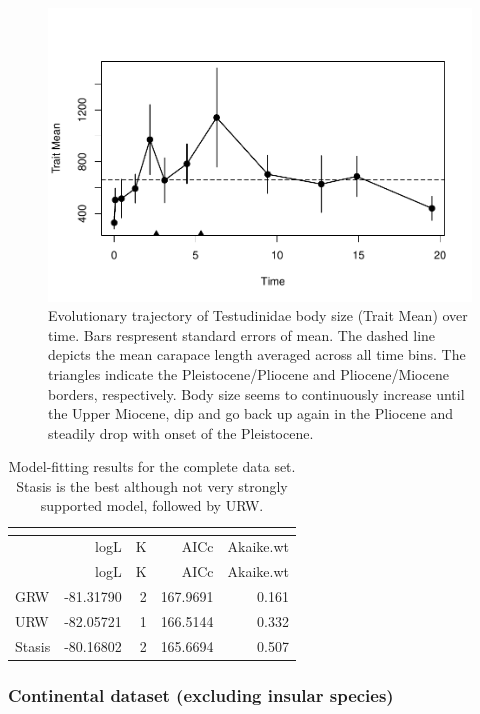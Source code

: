 \begin{figure}[H]
	\centering
	\includegraphics{MA_JJ_files/figure-latex/paleoTSAll-1.pdf}
	\caption[PaleoTS plot of the complete data set]{Evolutionary trajectory of Testudinidae body size (Trait Mean) over time. Bars respresent standard errors of mean. The dashed line depicts the mean carapace length averaged across all time bins. The triangles indicate the Pleistocene/Pliocene and Pliocene/Miocene borders, respectively. Body size seems to continuously increase until the Upper Miocene, dip and go back up again in the Pliocene and steadily drop with onset of the Pleistocene.}
	\label{fig:pTSall}
\end{figure}

\begin{longtable}[]{@{}lrrrr@{}}
	\caption[Model fits for complete data set]{Model-fitting results for the complete data set. Stasis is the best although not very strongly supported model, followed by URW.}
	\label{tab:pTSallEM}\tabularnewline
	\toprule
	& logL & K & AICc & Akaike.wt\tabularnewline
	\midrule
	\endfirsthead
	\toprule
	& logL & K & AICc & Akaike.wt\tabularnewline
	\midrule
	\endhead
	GRW & -81.31790 & 2 & 167.9691 & 0.161\tabularnewline
	URW & -82.05721 & 1 & 166.5144 & 0.332\tabularnewline
	Stasis & -80.16802 & 2 & 165.6694 & 0.507\tabularnewline
	\bottomrule
\end{longtable}

\FloatBarrier

\subsubsection{Continental dataset (excluding insular
	species)}\label{continental-excluding-insular-species}



